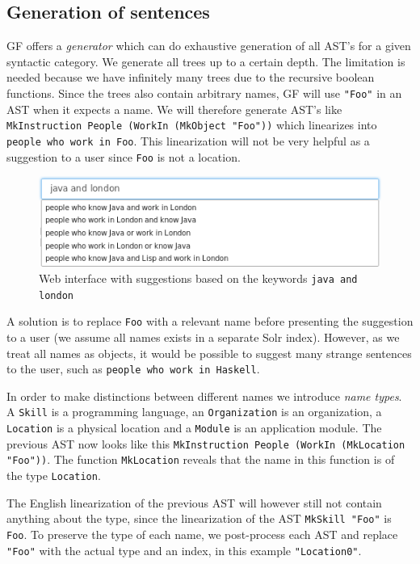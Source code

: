 \documentclass[10pt, a4paper]{article}
\begin{document}
\subsection{Generation of sentences}
GF offers a \emph{generator} which can do exhaustive generation of
all AST's for a given syntactic category. We generate all trees up to 
a certain depth. The limitation is needed because we have infinitely 
many trees due to the recursive boolean functions. Since the trees also
contain arbitrary names, GF will use  \texttt{"Foo"} in an AST 
when it expects a name. We will therefore generate AST's like 
\texttt{MkInstruction People (WorkIn (MkObject "Foo"))} which linearizes 
into \texttt{people who work in Foo}. This linearization will not 
be very helpful as a suggestion to a user since \texttt{Foo} is not a location.

\begin{figure}[!h]
\centering
\includegraphics[scale=0.95]{./java-london.png}
\caption{Web interface with suggestions based on the keywords \texttt{java and london} \label{figure}}
\end{figure}

A solution is to replace \texttt{Foo} with a relevant name 
before presenting the suggestion to a user (we assume all names exists 
in a separate Solr index). However, as we treat all names as objects, 
it would be possible to suggest many strange sentences to the user, such as \texttt{people who work in Haskell}.

In order to make distinctions between different names we introduce \emph{name types}. A \texttt{Skill} is a programming language, an \texttt{Organization} is an organization, a \texttt{Location} is a physical location and a \texttt{Module} is an application module. The previous AST now looks like this \texttt{MkInstruction People (WorkIn (MkLocation "Foo"))}. The function \texttt{MkLocation} reveals that the name in this function is of the type \texttt{Location}. 

The English linearization of the previous AST will however still not contain anything about the type, since the linearization of the AST \texttt{MkSkill "Foo"} is \texttt{Foo}. To preserve the type of each name, we post-process each AST and replace \texttt{"Foo"} with the actual type and an index, in this example \texttt{"Location0"}.
\end{document}
